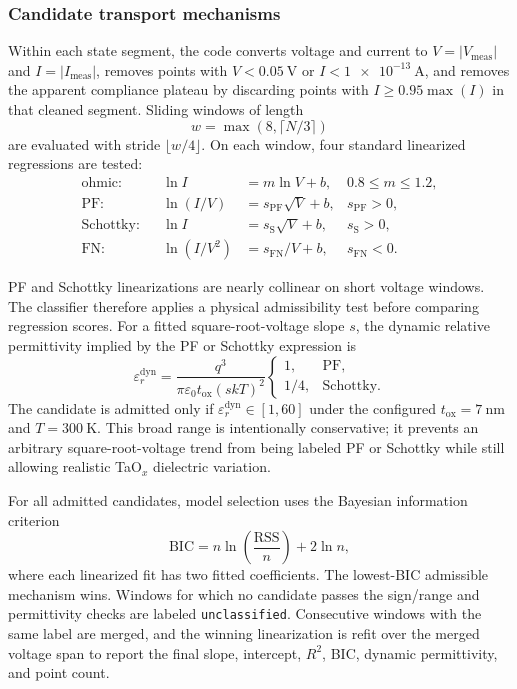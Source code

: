 \documentclass[journal]{IEEEtran}
\begin{document}
\subsubsection{Candidate transport mechanisms}
Within each state segment, the code converts voltage and current to
$V=|V_{\mathrm{meas}}|$ and $I=|I_{\mathrm{meas}}|$, removes points with
$V<\SI{0.05}{\volt}$ or $I<\SI{1e-13}{\ampere}$, and removes the apparent
compliance plateau by discarding points with
$I\ge 0.95\max(I)$ in that cleaned segment.  Sliding windows of length
\[
  w=\max(8,\lceil N/3\rceil)
\]
are evaluated with stride $\lfloor w/4\rfloor$.  On each window, four standard
linearized regressions are tested:
\begin{align}
  \text{ohmic:} &&
  \ln I &= m\ln V + b, &
  0.8 \le m \le 1.2, \label{eq:ohmic}\\
  \text{PF:} &&
  \ln(I/V) &= s_{\mathrm{PF}}\sqrt{V}+b, &
  s_{\mathrm{PF}}>0, \label{eq:pf}\\
  \text{Schottky:} &&
  \ln I &= s_{\mathrm{S}}\sqrt{V}+b, &
  s_{\mathrm{S}}>0, \label{eq:schottky}\\
  \text{FN:} &&
  \ln(I/V^2) &= s_{\mathrm{FN}}/V+b, &
  s_{\mathrm{FN}}<0. \label{eq:fn}
\end{align}

PF and Schottky linearizations are nearly collinear on short voltage windows.
The classifier therefore applies a physical admissibility test before
comparing regression scores.  For a fitted square-root-voltage slope $s$, the
dynamic relative permittivity implied by the PF or Schottky expression is
\begin{equation}
  \varepsilon_r^{\mathrm{dyn}}
  =
  \frac{q^3}{\pi\varepsilon_0 t_{\mathrm{ox}}(s kT)^2}
  \begin{cases}
    1, & \mathrm{PF},\\
    1/4, & \mathrm{Schottky}.
  \end{cases}
  \label{eq:eps-dyn}
\end{equation}
The candidate is admitted only if
$\varepsilon_r^{\mathrm{dyn}}\in[1,60]$ under the configured
$t_{\mathrm{ox}}=\SI{7}{\nano\meter}$ and $T=\SI{300}{\kelvin}$.  This broad
range is intentionally conservative; it prevents an arbitrary
square-root-voltage trend from being labeled PF or Schottky while still
allowing realistic TaO$_x$ dielectric variation.

For all admitted candidates, model selection uses the Bayesian information
criterion
\begin{equation}
  \mathrm{BIC}
  = n\ln\left(\frac{\mathrm{RSS}}{n}\right)+2\ln n,
  \label{eq:bic}
\end{equation}
where each linearized fit has two fitted coefficients.  The lowest-BIC
admissible mechanism wins.  Windows for which no candidate passes the
sign/range and permittivity checks are labeled \texttt{unclassified}.
Consecutive windows with the same label are merged, and the winning
linearization is refit over the merged voltage span to report the final slope,
intercept, $R^2$, BIC, dynamic permittivity, and point count.
\end{document}
